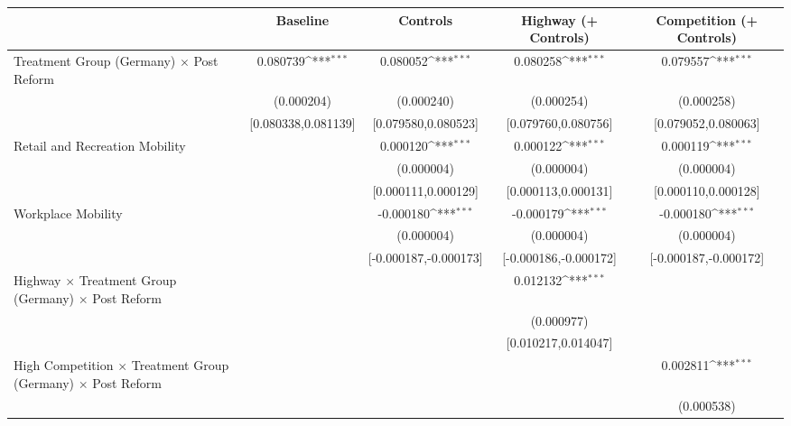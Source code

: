 {
\def\sym#1{\ifmmode^{#1}\else\(^{#1}\)\fi}
\begin{tabular}{l*{4}{c}}
\toprule
                    &\multicolumn{1}{c}{Baseline}&\multicolumn{1}{c}{Controls}&\multicolumn{1}{c}{Highway (+ Controls)}&\multicolumn{1}{c}{Competition (+ Controls)}\\
\midrule
Treatment Group (Germany) $\times$ Post Reform&    0.080739\sym{***}&    0.080052\sym{***}&    0.080258\sym{***}&    0.079557\sym{***}\\
                    &  (0.000204)         &  (0.000240)         &  (0.000254)         &  (0.000258)         \\
                    &[0.080338,0.081139]         &[0.079580,0.080523]         &[0.079760,0.080756]         &[0.079052,0.080063]         \\
Retail and Recreation Mobility&                     &    0.000120\sym{***}&    0.000122\sym{***}&    0.000119\sym{***}\\
                    &                     &  (0.000004)         &  (0.000004)         &  (0.000004)         \\
                    &                     &[0.000111,0.000129]         &[0.000113,0.000131]         &[0.000110,0.000128]         \\
Workplace Mobility  &                     &   -0.000180\sym{***}&   -0.000179\sym{***}&   -0.000180\sym{***}\\
                    &                     &  (0.000004)         &  (0.000004)         &  (0.000004)         \\
                    &                     &[-0.000187,-0.000173]         &[-0.000186,-0.000172]         &[-0.000187,-0.000172]         \\
Highway $\times$ Treatment Group (Germany) $\times$ Post Reform&                     &                     &    0.012132\sym{***}&                     \\
                    &                     &                     &  (0.000977)         &                     \\
                    &                     &                     &[0.010217,0.014047]         &                     \\
High Competition $\times$ Treatment Group (Germany) $\times$ Post Reform&                     &                     &                     &    0.002811\sym{***}\\
                    &                     &                     &                     &  (0.000538)         \\

\end{tabular}}
